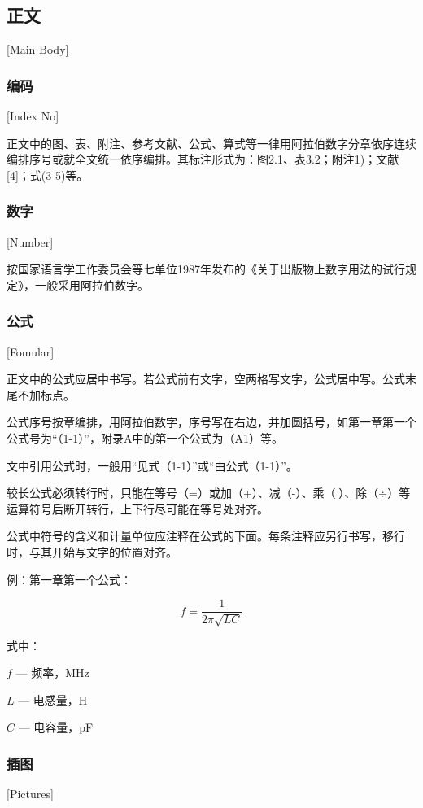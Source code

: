 \subsection{正文}[Main Body]


\subsubsection{编码}[Index No]

正文中的图、表、附注、参考文献、公式、算式等一律用阿拉伯数字分章依序连续编排序号或就全文统一依序编排。其标注形式为：图2.1、表3.2；附注1)；文献[4]；式(3-5)等。

\subsubsection{数字}[Number]

按国家语言学工作委员会等七单位1987年发布的《关于出版物上数字用法的试行规定》，一般采用阿拉伯数字。

\subsubsection{公式}[Fomular]

正文中的公式应居中书写。若公式前有文字，空两格写文字，公式居中写。公式末尾不加标点。

公式序号按章编排，用阿拉伯数字，序号写在右边，并加圆括号，如第一章第一个公式号为“（1-1）”，附录A中的第一个公式为（A1）等。

文中引用公式时，一般用“见式（1-1）”或“由公式（1-1）”。

较长公式必须转行时，只能在等号（=）或加（+）、减（-）、乘（）、除（÷）等运算符号后断开转行，上下行尽可能在等号处对齐。

公式中符号的含义和计量单位应注释在公式的下面。每条注释应另行书写，移行时，与其开始写文字的位置对齐。

例：第一章第一个公式：

\begin{equation}\label{form2x1}
	f=\frac{1}{2\pi\sqrt{LC}}
\end{equation}

式中：

\qquad $f$ --- 频率，MHz

\qquad $L$ --- 电感量，H

\qquad $C$ --- 电容量，pF 

\subsubsection{插图}[Pictures]

